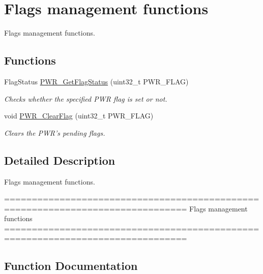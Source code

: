 \hypertarget{group___p_w_r___group7}{}\section{Flags management functions}
\label{group___p_w_r___group7}


Flags management functions.  


\subsection*{Functions}
\begin{DoxyCompactItemize}
\item 
Flag\+Status \hyperlink{group___p_w_r___group7_gaa980163a4d83304280ee34942464b4ec}{P\+W\+R\+\_\+\+Get\+Flag\+Status} (uint32\+\_\+t P\+W\+R\+\_\+\+F\+L\+A\+G)
\begin{DoxyCompactList}\small\item\em Checks whether the specified P\+W\+R flag is set or not. \end{DoxyCompactList}\item 
void \hyperlink{group___p_w_r___group7_ga01c4b2fbd16514b993324e101c3ddf7c}{P\+W\+R\+\_\+\+Clear\+Flag} (uint32\+\_\+t P\+W\+R\+\_\+\+F\+L\+A\+G)
\begin{DoxyCompactList}\small\item\em Clears the P\+W\+R's pending flags. \end{DoxyCompactList}\end{DoxyCompactItemize}


\subsection{Detailed Description}
Flags management functions. 

\begin{DoxyVerb} ===============================================================================
                           Flags management functions
 ===============================================================================  \end{DoxyVerb}
 

\subsection{Function Documentation}
\hypertarget{group___p_w_r___group7_ga01c4b2fbd16514b993324e101c3ddf7c}{}
